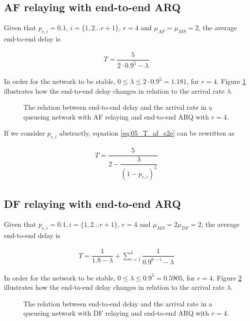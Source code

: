 \subsection{AF relaying with end-to-end ARQ}
Given that $p_{e,i} = 0.1$, $i = \{1,2 \dots r+1\}$, $r=4$ and
$\mu_{AF} = \mu_{MS} = 2$, the average end-to-end delay is

\begin{align}
  T = \dfrac{5}{2 \cdot 0.9^5 - \lambda}
  \label{eq:05_T_af_e2e}
\end{align}

In order for the network to be stable,
$0 \leq \lambda \leq 2 \cdot 0.9^5 = 1.181$, for $r=4$. Figure
\ref{fig:05_arrival_rate_af_e2e} illustrates how the end-to-end delay changes
in relation to the arrival rate $\lambda$.

\begin{figure}\centering
  
  \caption{The relation between end-to-end delay and the arrival rate in a
    queueing network with AF relaying and end-to-end ARQ with $r=4$.}
  \label{fig:05_arrival_rate_af_e2e}
\end{figure}

If we consider $p_{e,i}$ abstractly, equation \ref{eq:05_T_af_e2e} can be
rewritten as

\begin{align*}
  T = \dfrac{5}{2 - \dfrac{\lambda}{(1-p_{e,i})^5}}
\end{align*}


\subsection{DF relaying with end-to-end ARQ}

Given that $p_{e,i} = 0.1, i = \{1,2 \dots r+1\}$, $r=4$ and
$\mu_{MS} = 2\mu_{DF} = 2$, the average end-to-end delay is

\begin{align}
  T = \dfrac{1}{1.8 - \lambda} + \sum\limits_{i=1}^4 \dfrac{1}{0.9^{6-i} - \lambda}
  \label{eq:05_T_df_e2e}
\end{align}


In order for the network to be stable,
$0 \leq \lambda \leq 0.9^5 = 0.5905$, for $r=4$. Figure
\ref{fig:05_arrival_rate_df_e2e} illustrates how the end-to-end delay changes in
relation to the arrival rate $\lambda$.


\begin{figure}\centering
  
  \caption{The relation between end-to-end delay and the arrival rate in a
    queueing network with DF relaying and end-to-end ARQ with $r=4$.}
  \label{fig:05_arrival_rate_df_e2e}
\end{figure}


